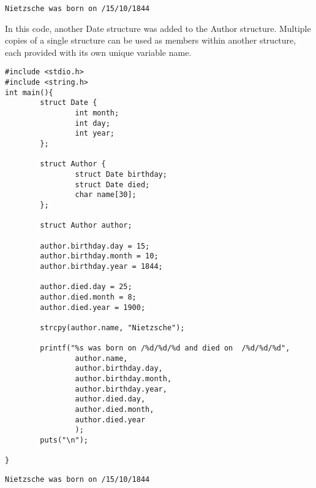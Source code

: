 \begin{lstlisting}
Nietzsche was born on /15/10/1844
\end{lstlisting}
\break
In this code, another Date structure was added to the Author structure.
Multiple copies of a single structure can be used as members within another structure,
each provided with its own unique variable name.
\begin{lstlisting}
#include <stdio.h>
#include <string.h>
int main(){
        struct Date {
                int month;
                int day;
                int year;
        };

        struct Author {
                struct Date birthday;
                struct Date died;
                char name[30];
        };
       
        struct Author author;

        author.birthday.day = 15;
        author.birthday.month = 10;
        author.birthday.year = 1844;

        author.died.day = 25;
        author.died.month = 8;
        author.died.year = 1900;

        strcpy(author.name, "Nietzsche");

        printf("%s was born on /%d/%d/%d and died on  /%d/%d/%d",
                author.name,
                author.birthday.day,
                author.birthday.month,
                author.birthday.year,
                author.died.day,
                author.died.month,
                author.died.year
                );
        puts("\n");
       
}
\end{lstlisting}

\begin{lstlisting}
Nietzsche was born on /15/10/1844
\end{lstlisting}

